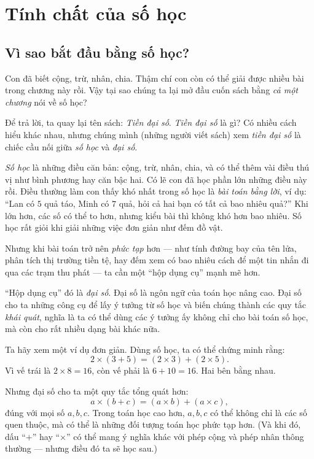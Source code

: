 \documentclass[14pt,a4paper]{extbook}
\begin{document}
\chapter{Tính chất của số học}
\section{Vì sao bắt đầu bằng số học?}

Con đã biết cộng, trừ, nhân, chia. Thậm chí con còn có thể giải
được nhiều bài trong chương này rồi. Vậy tại sao chúng ta lại mở
đầu cuốn sách bằng \emph{cả một chương} nói về số học?

Để trả lời, ta quay lại tên sách: \emph{Tiền đại số}. \emph{Tiền
đại số} là gì? Có nhiều cách hiểu khác nhau, nhưng chúng mình
(những người viết sách) xem \emph{tiền đại số} là chiếc cầu nối
giữa \emph{số học} và \emph{đại số}.

\emph{Số học} là những điều căn bản: cộng, trừ, nhân, chia, và có
thể thêm vài điều thú vị như bình phương hay căn bậc hai. Có lẽ
con đã học phần lớn những điều này rồi. Điều thường làm con thấy
khó nhất trong số học là \emph{bài toán bằng lời}, ví dụ: “Lan có
$5$ quả táo, Minh có $7$ quả, hỏi cả hai bạn có tất cả bao nhiêu
quả?” Khi lớn hơn, các số có thể to hơn, nhưng kiểu bài thì không
khó hơn bao nhiêu. Số học rất giỏi khi giải những việc đơn giản
như đếm đồ vật. 

Nhưng khi bài toán trở nên \emph{phức tạp} hơn — như tính đường
bay của tên lửa, phân tích thị trường tiền tệ, hay đếm xem có bao
nhiêu cách để một tin nhắn đi qua các trạm thu phát — ta cần một
“hộp dụng cụ” mạnh mẽ hơn.

“Hộp dụng cụ” đó là \emph{đại số}. Đại số là ngôn ngữ của toán
học nâng cao. Đại số cho ta những công cụ để lấy ý tưởng từ số học
và biến chúng thành các quy tắc \emph{khái quát}, nghĩa là ta có
thể dùng các ý tưởng ấy không chỉ cho bài toán số học, mà còn cho
rất nhiều dạng bài khác nữa.

Ta hãy xem một ví dụ đơn giản. Dùng số học, ta có thể chứng minh rằng:
\[
2\times(3+5)=(2\times3)+(2\times5).
\]
Vì vế trái là $2\times8=16$, còn vế phải là $6+10=16$. Hai bên bằng nhau.

Nhưng đại số cho ta một quy tắc tổng quát hơn:
\[
a\times(b+c)=(a\times b)+(a\times c),
\]
đúng với mọi số $a,b,c$. Trong toán học cao hơn, $a,b,c$ có thể không
chỉ là các số quen thuộc, mà có thể là những đối tượng toán học phức
tạp hơn. (Và khi đó, dấu “$+$” hay “$\times$” có thể mang ý nghĩa khác
với phép cộng và phép nhân thông thường — nhưng điều đó ta sẽ học sau.)
\end{document}
